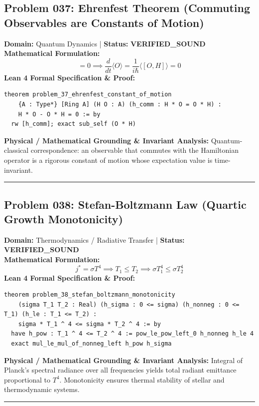 \documentclass[10pt,a4paper]{article}
\begin{document}
\subsection*{Problem 037: Ehrenfest Theorem (Commuting Observables are Constants of Motion)}
\textbf{Domain:} Quantum Dynamics \quad | \quad \textbf{Status:} \textcolor{green!70!black}{\textbf{VERIFIED\_SOUND}}\\
\textbf{Mathematical Formulation:}
\begin{equation*}
  [H, O] = 0 \implies \frac{d}{dt}\langle O \rangle = \frac{1}{i\hbar}\langle [O, H] \rangle = 0
\end{equation*}
\textbf{Lean 4 Formal Specification \& Proof:}
\begin{lstlisting}
theorem problem_37_ehrenfest_constant_of_motion
    {A : Type*} [Ring A] (H O : A) (h_comm : H * O = O * H) :
    H * O - O * H = 0 := by
  rw [h_comm]; exact sub_self (O * H)
\end{lstlisting}
\textbf{Physical / Mathematical Grounding \& Invariant Analysis:}
Quantum-classical correspondence: an observable that commutes with the Hamiltonian operator is a rigorous constant of motion whose expectation value is time-invariant.
\vspace{0.8em}\hrule\vspace{0.8em}
\subsection*{Problem 038: Stefan-Boltzmann Law (Quartic Growth Monotonicity)}
\textbf{Domain:} Thermodynamics / Radiative Transfer \quad | \quad \textbf{Status:} \textcolor{green!70!black}{\textbf{VERIFIED\_SOUND}}\\
\textbf{Mathematical Formulation:}
\begin{equation*}
  j^* = \sigma T^4 \implies T_1 \le T_2 \implies \sigma T_1^4 \le \sigma T_2^4
\end{equation*}
\textbf{Lean 4 Formal Specification \& Proof:}
\begin{lstlisting}
theorem problem_38_stefan_boltzmann_monotonicity
    (sigma T_1 T_2 : Real) (h_sigma : 0 <= sigma) (h_nonneg : 0 <= T_1) (h_le : T_1 <= T_2) :
    sigma * T_1 ^ 4 <= sigma * T_2 ^ 4 := by
  have h_pow : T_1 ^ 4 <= T_2 ^ 4 := pow_le_pow_left_0 h_nonneg h_le 4
  exact mul_le_mul_of_nonneg_left h_pow h_sigma
\end{lstlisting}
\textbf{Physical / Mathematical Grounding \& Invariant Analysis:}
Integral of Planck's spectral radiance over all frequencies yields total radiant emittance proportional to $T^4$. Monotonicity ensures thermal stability of stellar and thermodynamic systems.
\vspace{0.8em}\hrule\vspace{0.8em}
\end{document}
